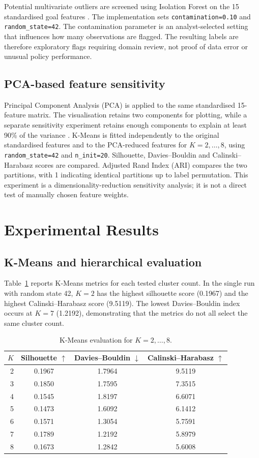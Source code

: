 \documentclass[11pt,a4paper]{article}
\begin{document}
Potential multivariate outliers are screened using Isolation Forest on the 15 standardised goal features \cite{liu2008}. The implementation sets \texttt{contamination=0.10} and \texttt{random\_state=42}. The contamination parameter is an analyst-selected setting that influences how many observations are flagged. The resulting labels are therefore exploratory flags requiring domain review, not proof of data error or unusual policy performance.

\subsection{PCA-based feature sensitivity}
Principal Component Analysis (PCA) is applied to the same standardised 15-feature matrix. The visualisation retains two components for plotting, while a separate sensitivity experiment retains enough components to explain at least 90\% of the variance \cite{jolliffe2016}. K-Means is fitted independently to the original standardised features and to the PCA-reduced features for $K=2,\ldots,8$, using \texttt{random\_state=42} and \texttt{n\_init=20}. Silhouette, Davies--Bouldin and Calinski--Harabasz scores are compared. Adjusted Rand Index (ARI) compares the two partitions, with 1 indicating identical partitions up to label permutation. This experiment is a dimensionality-reduction sensitivity analysis; it is not a direct test of manually chosen feature weights.

\section{Experimental Results}
\subsection{K-Means and hierarchical evaluation}
Table~\ref{tab:kmeans} reports K-Means metrics for each tested cluster count. In the single run with random state 42, $K=2$ has the highest silhouette score (0.1967) and the highest Calinski--Harabasz score (9.5119). The lowest Davies--Bouldin index occurs at $K=7$ (1.2192), demonstrating that the metrics do not all select the same cluster count.

\begin{table}[H]
\centering
\caption{K-Means evaluation for $K=2,\ldots,8$.}
\label{tab:kmeans}
\small
\begin{tabular}{rccc}
\toprule
$K$ & Silhouette $\uparrow$ & Davies--Bouldin $\downarrow$ & Calinski--Harabasz $\uparrow$\\
\midrule
2 & 0.1967 & 1.7964 & 9.5119\\
3 & 0.1850 & 1.7595 & 7.3515\\
4 & 0.1545 & 1.8197 & 6.6071\\
5 & 0.1473 & 1.6092 & 6.1412\\
6 & 0.1571 & 1.3054 & 5.7591\\
7 & 0.1789 & 1.2192 & 5.8979\\
8 & 0.1673 & 1.2842 & 5.6008\\
\bottomrule
\end{tabular}
\end{table}
\end{document}
